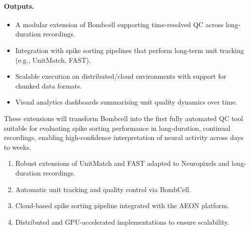 \paragraph{Outputs.}
\begin{itemize}
    \item A modular extension of Bombcell supporting time-resolved QC across long-duration recordings.
    \item Integration with spike sorting pipelines that perform long-term unit tracking (e.g., UnitMatch, FAST).
    \item Scalable execution on distributed/cloud environments with support for chunked data formats.
    \item Visual analytics dashboards summarising unit quality dynamics over time.
\end{itemize}

These extensions will transform Bombcell into the first fully automated QC tool suitable for evaluating spike sorting performance in long-duration, continual recordings, enabling high-confidence interpretation of neural activity across days to weeks.

\begin{enumerate}
    \item Robust extensions of UnitMatch and FAST adapted to Neuropixels and long-duration recordings.
    \item Automatic unit tracking and quality control via BombCell.
    \item Cloud-based spike sorting pipeline integrated with the AEON platform.
    \item Distributed and GPU-accelerated implementations to ensure scalability.
\end{enumerate}

